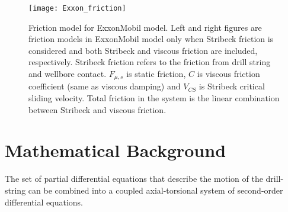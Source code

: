 \begin{figure}
  \centering
  \texttt{[image: Exxon\_friction]}
  \caption[Friction model for ExxonMobil model]{Friction model for ExxonMobil model. Left and right figures are friction models in ExxonMobil model only when Stribeck friction is considered and both Stribeck and viscous friction are included, respectively. Stribeck friction refers to the friction from drill string and wellbore contact. $F_{\mu, s}$ is static friction, $C$ is viscous friction coefficient (same as viscous damping) and $V_{CS}$ is Stribeck critical sliding velocity. Total friction in the system is the linear combination between Stribeck and viscous friction. }\label{figure_Exxon_friction}
\end{figure}



\section{Mathematical Background}

The set of partial differential equations that describe the motion of the drill-string can be combined into a coupled axial-torsional system of second-order differential equations.

